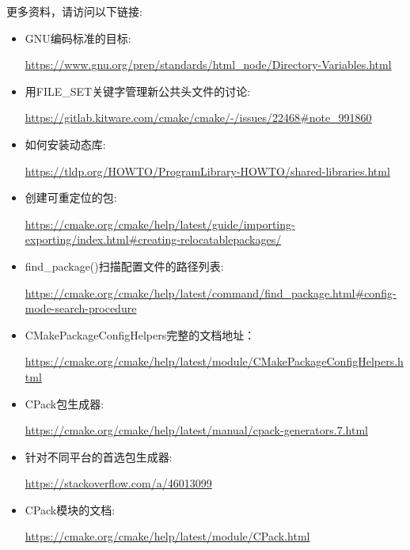 更多资料，请访问以下链接:

\begin{itemize}
\item 
GNU编码标准的目标:

\url{https://www.gnu.org/prep/standards/html_node/Directory-Variables.html}

\item 
用FILE\_SET关键字管理新公共头文件的讨论:

\url{https://gitlab.kitware.com/cmake/cmake/-/issues/22468\#note_991860}

\item 
如何安装动态库:

\url{https://tldp.org/HOWTO/ProgramLibrary-HOWTO/shared-libraries.html}

\item 
创建可重定位的包:

\url{https://cmake.org/cmake/help/latest/guide/importing-exporting/index.html\#creating-relocatablepackages/}

\item 
find\_package()扫描配置文件的路径列表:

\url{https://cmake.org/cmake/help/latest/command/find_package.html\#config-mode-search-procedure}

\item 
CMakePackageConfigHelpers完整的文档地址：

\url{https://cmake.org/cmake/help/latest/module/CMakePackageConfigHelpers.html}

\item 
CPack包生成器:

\url{https://cmake.org/cmake/help/latest/manual/cpack-generators.7.html}

\item 
针对不同平台的首选包生成器: 

\url{https://stackoverflow.com/a/46013099}

\item 
CPack模块的文档:

\url{https://cmake.org/cmake/help/latest/module/CPack.html}
\end{itemize}
